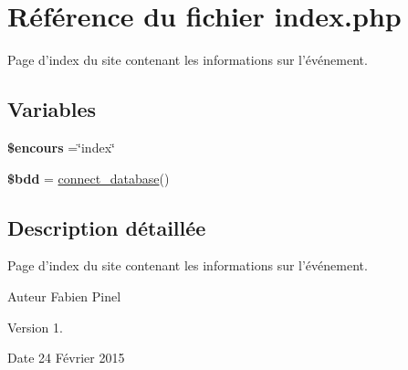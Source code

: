 \hypertarget{index_8php}{\section{Référence du fichier index.\-php}
\label{index_8php}
}


Page d'index du site contenant les informations sur l'événement.  


\subsection*{Variables}
\begin{DoxyCompactItemize}
\item 
\hypertarget{index_8php_af7b0e56292699e6983c24fbbf70ce08d}{{\bfseries \$encours} =\char`\"{}index\char`\"{}}\label{index_8php_af7b0e56292699e6983c24fbbf70ce08d}

\item 
\hypertarget{index_8php_a94f91e878bce0991e2cd595c5dd79b3f}{{\bfseries \$bdd} = \hyperlink{function_8php_a1f56f7efe8c1222675d8715c259957d5}{connect\-\_\-database}()}\label{index_8php_a94f91e878bce0991e2cd595c5dd79b3f}

\end{DoxyCompactItemize}


\subsection{Description détaillée}
Page d'index du site contenant les informations sur l'événement. \begin{DoxyAuthor}{Auteur}
Fabien Pinel 
\end{DoxyAuthor}
\begin{DoxyVersion}{Version}
1. 
\end{DoxyVersion}
\begin{DoxyDate}{Date}
24 Février 2015 
\end{DoxyDate}
